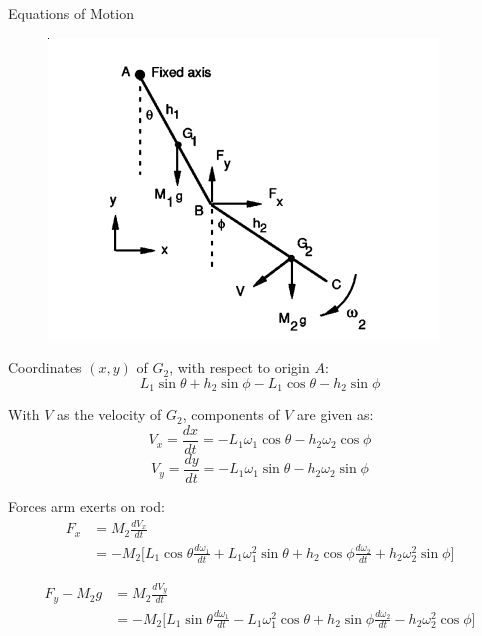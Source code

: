 \documentclass[tikz]{beamer}
\begin{document}
\begin{frame} {Equations of Motion}

	 {
		\begin{figure}
			\centering
			\includegraphics[scale=0.75]{equationsofmotion.png}
		\end{figure}
	}
	
	 {
		Coordinates $(x,y)$ of $G_2$, with respect to origin $A$:
		\begin{equation}
			L_1 \sin{\theta} + h_2 \sin{\phi} - L_1 \cos{\theta} - h_2 \sin{\phi} \tag{1}
		\end{equation}
		
		With $V$ as the velocity of $G_2$, components of $V$ are given as:
		\begin{equation}
			V_x = \frac{dx}{dt} = -L_1 \omega_1 \cos{\theta} - h_2 \omega_2 \cos{\phi} \tag{2}
		\end{equation}
		\begin{equation}
			V_y = \frac{dy}{dt} = -L_1 \omega_1 \sin{\theta} - h_2 \omega_2 \sin{\phi} \tag{3}
		\end{equation}
	}

	 {
		Forces arm exerts on rod:
		\begin{equation*}
			\begin{aligned}
				F_x & = M_2 \frac{d V_x}{dt} \\
				    & = -M_2 \bigg [ L_1 \cos{\theta} \frac{d \omega_1}{dt} + L_1 \omega_1^2 \sin{\theta} + h_2 \cos{\phi} \frac{d \omega_2}{dt} + h_2 \omega_2^2 \sin{\phi} \bigg ]
			\end{aligned}
		\end{equation*}

		\begin{equation*}
			\begin{aligned}
				F_y - M_2 g & = M_2 \frac{d V_y}{dt}\\
				& = -M_2 \bigg [ L_1 \sin{\theta} \frac{d \omega_1}{dt} - L_1 \omega_1^2 \cos{\theta} + h_2 \sin{\phi} \frac{d \omega_2}{dt} - h_2 \omega_2^2 \cos{\phi} \bigg ]
			\end{aligned}
		\end{equation*}
	}


\end{frame}
\end{document}
